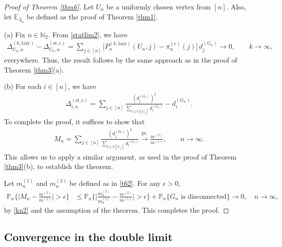\documentclass[11pt]{article}
\numberwithin{equation}{section}
\theoremstyle{plain}
\newcommand{\N}{\mathbb N}
\newcommand{\prob}{\overset{\mathrm{pr.}}{\longrightarrow}}
\newcommand{\E}{\mathbb E}
\renewcommand{\P}{\mathbb P}
\newcommand{\dn}{d^{(G_{n})}}
\begin{document}
\begin{proof}[Proof of Theorem \ref{thm6}]
Let $U_{n}$ be a uniformly chosen vertex from $[n]$. Also, let $\E_{\bar{\Lambda}_{n}}$ be defined as the proof of Theorem \ref{thm1}.

\medskip\noindent
(a) Fix $n\in\N_{2}$. From \eqref{statlim2}, we have
\begin{align*}
\Delta_{U_n,n}^{(k,\mathrm{lazy})}-\Delta^{(\mathrm{st},\mathrm{c})}_{U_n,n} =\sum_{j \in [n]} \big[P_{n}^{(k,\mathrm{lazy})}(U_n,j)-\pi_{n}^{(\mathrm{c})}(j)\big] \,d_{j}^{(G_{n})} 
\to 0, \qquad k\to \infty ,
\end{align*}
everywhere. Thus, the result follows by the same approach as in the proof of Theorem \ref{thm3}(a).

\medskip\noindent
(b) For each $i\in[n]$, we have
\begin{align*}
\Delta^{(\mathrm{st},\mathrm{c})}_{i,n} = \sum_{j\in [n]}\frac{(\dn_{j})^2}{\sum_{l\in V(C_{j})}\dn_{l}}-\dn_{i}.
\end{align*}
To complete the proof, it suffices to show that
\begin{align}
\label{t61}
M_{n}=\sum_{j\in [n]}\frac{(\dn_{j})^2}{\sum_{l\in V(C_{j})}\dn_{l}} \prob \frac{m^{(2)}}{m^{(1)}},\qquad n\to\infty.
\end{align}
This allows us to apply a similar argument, as used in the proof of Theorem \ref{thm3}(b), to establish the theorem. 

Let $m_{n}^{(1)}$ and $m_{n}^{(2)}$ be defined as in \eqref{t62}. For any $\epsilon>0$,
\begin{align*}
\P_{n}\bigg\{\Big|M_{n}-\frac{m^{(2)}}{m^{(1)}}\Big|>\epsilon\bigg\}&
\leq \P_{n}\bigg\{\Big|\frac{m_{n}^{(2)}}{m_{n}^{(1)}}-\frac{m^{(2)}}{m^{(1)}}\Big|>\epsilon\bigg\}+\P_{n}\Big\{G_{n}\text{ is disconnected}\Big\}\to 0,\quad n\to\infty,
\end{align*}
by \eqref{kn2} and the assumption of the theorem. This completes the proof.
\end{proof}


\subsection{Convergence in the double limit}
\label{sec:doublelimit}
\end{document}
